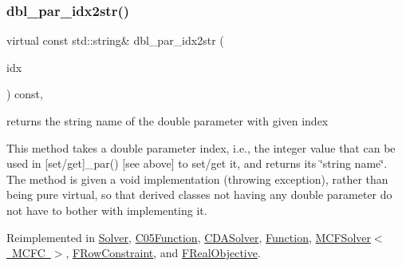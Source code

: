 \mbox{\label{class_s_m_spp__di__unipi__it_1_1_thin_compute_interface_a1be0e4ca13f9253674bc4fa7b67fe40e}} 
\subsubsection{\texorpdfstring{dbl\+\_\+par\+\_\+idx2str()}{dbl\_par\_idx2str()}}
{\footnotesize\ttfamily virtual const std\+::string\& dbl\+\_\+par\+\_\+idx2str (\begin{DoxyParamCaption}\item[{const \mbox{\hyperlink{class_s_m_spp__di__unipi__it_1_1_thin_compute_interface_aa3d710629ad8c434286726ad810c3b47}{idx\+\_\+type}}}]{idx }\end{DoxyParamCaption}) const\hspace{0.3cm}{\ttfamily [inline]}, {\ttfamily [virtual]}}



returns the string name of the double parameter with given index 

This method takes a double parameter index, i.\+e., the integer value that can be used in \mbox{[}set/get\mbox{]}\+\_\+par() \mbox{[}see above\mbox{]} to set/get it, and returns its \char`\"{}string name\char`\"{}. The method is given a void implementation (throwing exception), rather than being pure virtual, so that derived classes not having any double parameter do not have to bother with implementing it. 

Reimplemented in \mbox{\hyperlink{class_s_m_spp__di__unipi__it_1_1_solver_a93f1297e7910e91cc18b303376191026}{Solver}}, \mbox{\hyperlink{class_s_m_spp__di__unipi__it_1_1_c05_function_a93f1297e7910e91cc18b303376191026}{C05\+Function}}, \mbox{\hyperlink{class_s_m_spp__di__unipi__it_1_1_c_d_a_solver_a93f1297e7910e91cc18b303376191026}{C\+D\+A\+Solver}}, \mbox{\hyperlink{class_s_m_spp__di__unipi__it_1_1_function_a93f1297e7910e91cc18b303376191026}{Function}}, \mbox{\hyperlink{class_s_m_spp__di__unipi__it_1_1_m_c_f_solver_a93f1297e7910e91cc18b303376191026}{M\+C\+F\+Solver$<$ M\+C\+F\+C $>$}}, \mbox{\hyperlink{class_s_m_spp__di__unipi__it_1_1_f_row_constraint_a93f1297e7910e91cc18b303376191026}{F\+Row\+Constraint}}, and \mbox{\hyperlink{class_s_m_spp__di__unipi__it_1_1_f_real_objective_a93f1297e7910e91cc18b303376191026}{F\+Real\+Objective}}.

